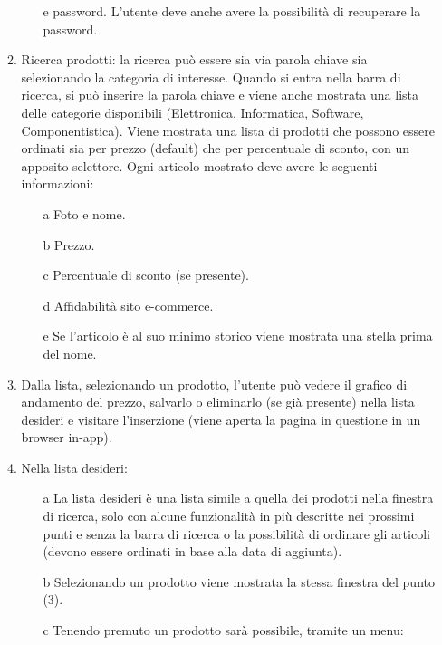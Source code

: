 \documentclass{article}
\begin{document}
\begin{itemize}
\begin{enumerate}
\begin{itemize}
                                e password. L'utente deve anche avere la possibilità di recuperare la password.
                    \end{itemize}
                \item Ricerca prodotti: la ricerca può essere sia via parola chiave sia selezionando la categoria di interesse. Quando si
                        entra nella barra di ricerca, si può inserire la parola chiave e viene anche mostrata una lista delle categorie disponibili
                        (Elettronica, Informatica, Software, Componentistica). Viene mostrata una lista di prodotti che possono essere
                        ordinati sia per prezzo (default) che per percentuale di sconto, con un apposito selettore. Ogni articolo mostrato
                        deve avere le seguenti informazioni:
                \begin{itemize}
                    \item [a] Foto e nome.
                    \item [b] Prezzo.
                    \item [c] Percentuale di sconto (se presente).
                    \item [d] Affidabilità sito e-commerce.
                    \item [e] Se l’articolo è al suo minimo storico viene mostrata una stella prima del nome.
                \end{itemize}
                \item Dalla lista, selezionando un prodotto, l’utente può vedere il grafico di andamento del prezzo, salvarlo o eliminarlo
                (se già presente) nella lista desideri e visitare l’inserzione (viene aperta la pagina in questione in un browser in-app).
                \item Nella lista desideri:
                \begin{itemize}
                    \item [a] La lista desideri è una lista simile a quella dei prodotti nella finestra di ricerca, solo con alcune
                            funzionalità in più descritte nei prossimi punti e senza la barra di ricerca o la possibilità di ordinare
                            gli articoli (devono essere ordinati in base alla data di aggiunta).
                    \item [b] Selezionando un prodotto viene mostrata la stessa finestra del punto (3).
                    \item [c] Tenendo premuto un prodotto sarà possibile, tramite un menu:

\end{itemize}
\end{enumerate}
\end{itemize}
\end{document}
